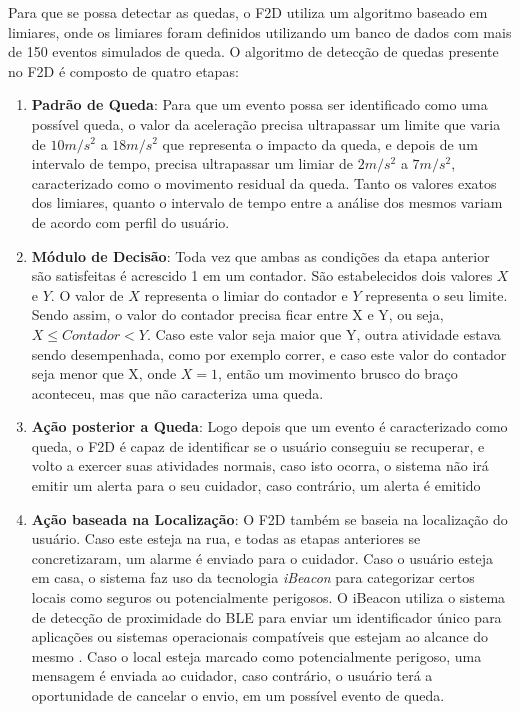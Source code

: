 Para que se possa detectar as quedas, o F2D utiliza um algoritmo baseado em limiares, onde os limiares foram definidos utilizando um banco de dados com mais de 150 eventos simulados de queda. O algoritmo de detecção de quedas presente no F2D é composto de quatro etapas\citep{kostopoulos2015f2d}:

\begin{enumerate}
	
	\item{\textbf{Padrão de Queda}: Para que um evento possa ser identificado como uma possível queda, o valor da aceleração precisa ultrapassar um limite que varia de $10 m/s^{2}$ a $18 m/s^{2}$ que representa o impacto da queda, e depois de um intervalo de tempo, precisa ultrapassar um limiar de $2 m/s^{2}$  a $7 m/s^{2}$, caracterizado como o movimento residual da queda. Tanto os valores exatos dos limiares, quanto o intervalo de tempo entre a análise dos mesmos variam de acordo com perfil do usuário.   }
	
	\item{\textbf{Módulo de Decisão}: Toda vez que ambas as condições da etapa anterior são satisfeitas é acrescido 1 em um contador. São estabelecidos dois valores $X$ e $Y$. O valor de $X$ representa o limiar do contador e $Y$ representa o seu limite. Sendo assim, o valor do contador precisa ficar entre X e Y, ou seja, $ X \leq Contador < Y $. Caso este valor seja maior que Y, outra atividade estava sendo desempenhada, como por exemplo correr, e caso este valor do contador seja menor que X, onde $X = 1$, então um movimento brusco do braço aconteceu, mas que não caracteriza uma queda.  }
	
	\item{\textbf{Ação posterior a Queda}: Logo depois que um evento é caracterizado como queda, o F2D é capaz de identificar se o usuário conseguiu se recuperar, e volto a exercer suas atividades normais, caso isto ocorra, o sistema não irá emitir um alerta para o seu cuidador, caso contrário, um alerta é emitido }
	
	\item{\textbf{Ação baseada na Localização}: O F2D também se baseia na localização do usuário. Caso este esteja na rua, e todas as etapas anteriores se concretizaram, um alarme é enviado para o cuidador. Caso o usuário esteja em casa, o sistema faz uso da tecnologia \textit{iBeacon} para categorizar certos locais como seguros ou potencialmente perigosos. O iBeacon utiliza o sistema de detecção de proximidade do \ac{BLE} para enviar um identificador único para aplicações ou sistemas operacionais compatíveis que estejam ao alcance do mesmo \citep{kostopoulos2015f2d}.  Caso o local esteja marcado como potencialmente perigoso, uma mensagem é enviada ao cuidador, caso contrário, o usuário terá a oportunidade de cancelar o envio, em um possível evento de queda.}     
	
	
\end{enumerate}


